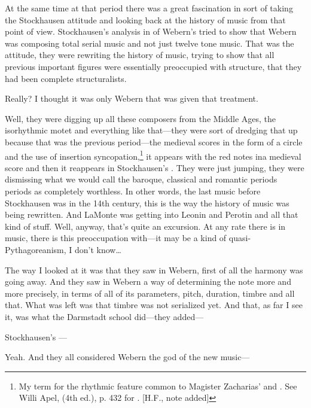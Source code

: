 At the same time at that period there was a great fascination in sort 
of taking the Stockhausen attitude and looking back at the history of 
music from that point of view. Stockhausen's analysis in  of 
Webern's  tried to show that Webern was 
composing total serial music and not just twelve tone music. That was 
the attitude, they were rewriting the history of music, trying to show 
that all previous important figures were essentially preoccupied with 
structure, that they had been complete structuralists. 


 Really? I thought it was only Webern that was given that 
treatment. 


 Well, they were digging up all these composers from the 
Middle Ages, the isorhythmic motet and everything like that---they 
were sort of dredging that up because that was the previous 
period---the medieval scores in the form of a circle and the use of insertion 
syncopation,\footnote{My term for the rhythmic feature common to Magister Zacharias'  and . See Willi Apel,  (4th ed.), p. 432 for . [H.F., note added]}
it appears with the red notes ina medieval score and then 
it reappears in Stockhausen's . They were just jumping, 
they were dismissing what we would call the baroque, classical and 
romantic periods periods as completely worthless. In other words, the 
last music before Stockhausen was in the 14th century, this is the way 
the history of music was being rewritten. And LaMonte was getting 
into Leonin and Perotin and all that kind of stuff. Well, anyway, that's 
quite an excursion. 
At any rate there is in music, there is this preoccupation with---it 
may be a kind of quasi-Pythagoreanism, I don't know\ldots

 The way I looked at it was that they saw in Webern, first of 
all the harmony was going away. And they saw in Webern a way of 
determining the note more and more precisely, in terms of all of its 
parameters, pitch, duration, timbre and all that. What was left was that 
timbre was not serialized yet. And that, as far I see it, was what the 
Darmstadt school did---they added--- 

 Stockhausen's --- 

 Yeah. And they all considered Webern the god of the new 
music--- 

